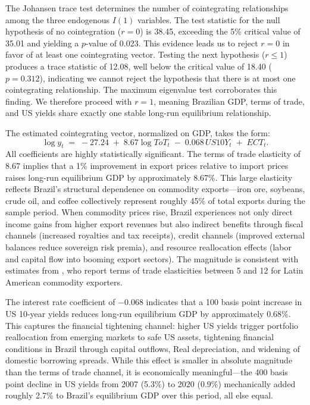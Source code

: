\documentclass[12pt,a4paper]{article}
\numberwithin{equation}{section}
\theoremstyle{definition}
\theoremstyle{remark}
\begin{document}
The Johansen trace test determines the number of cointegrating relationships among the three endogenous $I(1)$ variables. The test statistic for the null hypothesis of no cointegration ($r=0$) is 38.45, exceeding the 5\% critical value of 35.01 and yielding a $p$-value of 0.023. This evidence leads us to reject $r=0$ in favor of at least one cointegrating vector. Testing the next hypothesis ($r \leq 1$) produces a trace statistic of 12.08, well below the critical value of 18.40 ($p=0.312$), indicating we cannot reject the hypothesis that there is at most one cointegrating relationship. The maximum eigenvalue test corroborates this finding. We therefore proceed with $r=1$, meaning Brazilian GDP, terms of trade, and US yields share exactly one stable long-run equilibrium relationship.

The estimated cointegrating vector, normalized on GDP, takes the form:
\begin{equation}
\label{eq:cointegrating_relationship}
\log y_t \;=\; -27.24 \;+\; 8.67 \log ToT_t \;-\; 0.068 \, US10Y_t \;+\; ECT_t.
\end{equation}
All coefficients are highly statistically significant. The terms of trade elasticity of 8.67 implies that a 1\% improvement in export prices relative to import prices raises long-run equilibrium GDP by approximately 8.67\%. This large elasticity reflects Brazil's structural dependence on commodity exports---iron ore, soybeans, crude oil, and coffee collectively represent roughly 45\% of total exports during the sample period. When commodity prices rise, Brazil experiences not only direct income gains from higher export revenues but also indirect benefits through fiscal channels (increased royalties and tax receipts), credit channels (improved external balances reduce sovereign risk premia), and resource reallocation effects (labor and capital flow into booming export sectors). The magnitude is consistent with estimates from \textcite{izquierdo2008booms}, who report terms of trade elasticities between 5 and 12 for Latin American commodity exporters.

The interest rate coefficient of $-0.068$ indicates that a 100 basis point increase in US 10-year yields reduces long-run equilibrium GDP by approximately 0.68\%. This captures the financial tightening channel: higher US yields trigger portfolio reallocation from emerging markets to safe US assets, tightening financial conditions in Brazil through capital outflows, Real depreciation, and widening of domestic borrowing spreads. While this effect is smaller in absolute magnitude than the terms of trade channel, it is economically meaningful---the 400 basis point decline in US yields from 2007 (5.3\%) to 2020 (0.9\%) mechanically added roughly 2.7\% to Brazil's equilibrium GDP over this period, all else equal.
\end{document}
